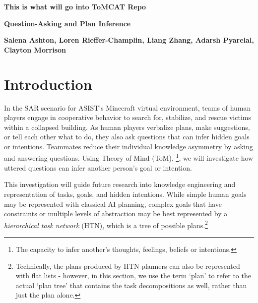 \documentclass[10pt]{article}
\begin{document}




\textbf{This is what will go into ToMCAT Repo}

\vspace{100pt}
\textbf{Question-Asking and Plan Inference}




\textbf{Salena Ashton, Loren Rieffer-Champlin, Liang Zhang,
Adarsh Pyarelal, Clayton Morrison}

\section{Introduction}

In the SAR scenario for ASIST's Minecraft virtual environment, teams of human players engage in cooperative behavior to search for, stabilize, and rescue victims within a collapsed building. As human players verbalize plans, make suggestions, or tell each other what to do, they also ask questions that can infer hidden goals or intentions. Teammates reduce their individual knowledge asymmetry by asking and answering questions. Using Theory of Mind (ToM), \footnote{The capacity to infer another's thoughts, feelings, beliefs or intentions.}, we will investigate how uttered questions can infer another person's goal or intention. 

This investigation will guide future research into knowledge engineering and representation of tasks, goals, and hidden intentions. While simple human goals may be represented with classical AI planning, complex goals that have constraints or multiple levels of abstraction may be best represented by a \emph{hierarchical task network} (HTN), which is a tree of possible plans.\footnote{Technically, the plans
    produced by HTN planners can also be represented with flat lists - however,
in this section, we use the term `plan' to refer to the actual `plan tree' that
contains the task decompositions as well, rather than just the plan alone.}
\end{document}
